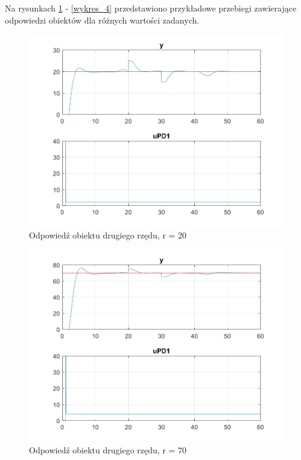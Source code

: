 Na rysunkach \ref{wykres_1} - \ref{wykres_4} przedstawiono przykładowe przebiegi zawierające odpowiedzi obiektów dla różnych wartości zadanych.

\begin{figure}[]
	\centering
	\includegraphics[scale = 0.7]{fig/Z1_New_Signal_1/fig1_2_20.png}
	\caption		
	{Odpowiedź obiektu drugiego rzędu, r = 20}
	\label{wykres_1}
\end{figure} 

\begin{figure}[]
	\centering
	\includegraphics[scale = 0.7]{fig/Z1_New_Signal_1/fig1_2_70.png}
	\caption		
	{Odpowiedź obiektu drugiego rzędu, r = 70}
	\label{wykres_2}
\end{figure} 


